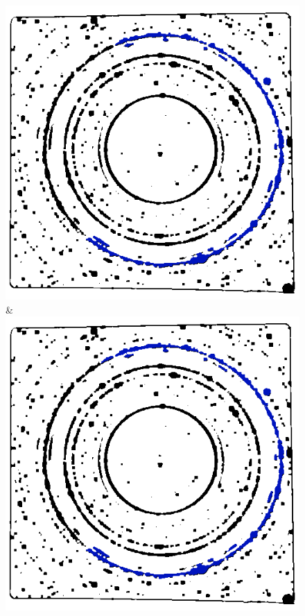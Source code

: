 \documentclass[preprint]{iucr}              %
\begin{document}
\begin{figure}
\begin{tabular}
\includegraphics[width=\linewidth]{Detail/o_Si12_0002_R_2_2.png}&
\includegraphics[width=\linewidth]{Detail/o_Si12_0002_R_2_3.png}
\\

\end{tabular}
\end{figure}
\end{document}
